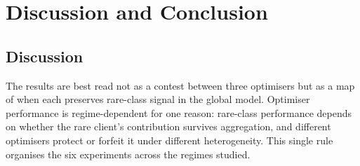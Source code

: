 \documentclass[11pt,a4paper]{report}
\begin{document}










\chapter{Discussion and Conclusion}
\label{ch:discussion}

\section{Discussion}
\label{sec:disc}

The results are best read not as a contest between three optimisers but as a map
of when each preserves rare-class signal in the global model. Optimiser
performance is regime-dependent for one reason: rare-class performance depends on
whether the rare client's contribution survives aggregation, and different
optimisers protect or forfeit it under different heterogeneity. This single rule
organises the six experiments across the regimes studied.
\end{document}

